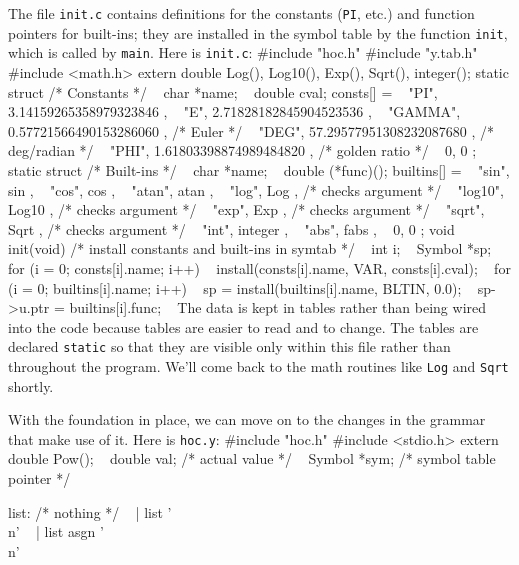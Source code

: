 {The file {\tt init.c} contains definitions for the constants
({\tt PI}, etc.) and function pointers for built-ins; they are
installed in the symbol table by the function {\tt init},
which is called by {\tt main}. Here is {\tt init.c}:
\begincode
#include "hoc.h"
#include "y.tab.h"
#include <math.h>
\medskip
extern double Log(), Log10(), Exp(), Sqrt(), integer();
\medbreak
static struct {        /* Constants */
~   char    *name;
~   double  cval;
} consts[] = {
~   { "PI",    3.14159265358979323846 },
~   { "E",     2.71828182845904523536 },
~   { "GAMMA", 0.57721566490153286060 },  /* Euler */
~   { "DEG",  57.29577951308232087680 },  /* deg/radian */
~   { "PHI",   1.61803398874989484820 },  /* golden ratio */
~   { 0,       0 }
};
\medbreak
static struct {        /* Built-ins */
~   char    *name;
~   double  (*func)();
} builtins[] = {
~   { "sin",    sin     },
~   { "cos",    cos     },
~   { "atan",   atan    },
~   { "log",    Log     },  /* checks argument */
~   { "log10",  Log10   },  /* checks argument */
~   { "exp",    Exp     },  /* checks argument */
~   { "sqrt",   Sqrt    },  /* checks argument */
~   { "int",    integer },
~   { "abs",    fabs    },
~   { 0,        0       }
};
\medbreak
void init(void)  /* install constants and built-ins in symtab */
{
~       int i;
~       Symbol *sp;
\smallbreak
~       for (i = 0; consts[i].name; i++)
~               install(consts[i].name, VAR, consts[i].cval);
~       for (i = 0; builtins[i].name; i++) {
~               sp = install(builtins[i].name, BLTIN, 0.0);
~               sp->u.ptr = builtins[i].func;
~       }
}
\endcode
\noindent
The data is kept in tables rather than being wired into the
code because tables are easier to read and to change. The tables
are declared {\tt static} so that they are visible only within
this file rather than throughout the program. We'll come back
to the math routines like {\tt Log} and {\tt Sqrt} shortly.

With the foundation in place, we can move on to the changes
in the grammar that make use of it. Here is {\tt hoc.y}:
\begincode
#include "hoc.h"
#include <stdio.h>
extern double Pow();
\smallbreak
~       double  val;    /* actual value */
~       Symbol *sym;    /* symbol table pointer */
}
\smallbreak
\smallbreak
list:     /* nothing */
~       | list       '\\n'
~       | list asgn  '\\n'
